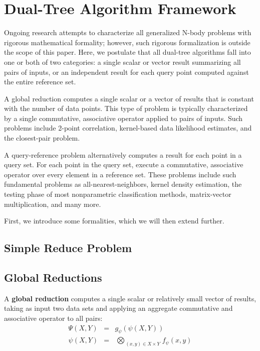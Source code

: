 \documentclass[times, leqno,twocolumn]{article}
\newcommand{\defterm}[1]{{\bf #1}}
\newcommand{\myOp}[1]{\mathop{\bigotimes\nolimits\!\!_{#1}}}
\newcommand{\letterglob}{\psi}
\newcommand{\outglob}{\Psi}
\newcommand{\inglob}{\psi}
\newcommand{\Opglob}{\myOp{\letterglob}}
\newcommand{\fglob}{f_{\letterglob}}
\newcommand{\gglob}{g_{\letterglob}}
\begin{document}
\section{Dual-Tree Algorithm Framework}

Ongoing research attempts to characterize all generalized N-body problems with rigorous mathematical formality; however, such rigorous formalization is outside the scope of this paper.
Here, we postulate that all dual-tree algorithms fall into one or both of two categories: a single scalar or vector result summarizing all pairs of inputs, or an independent result for each query point computed against the entire reference set.

A global reduction computes a single scalar or a vector of results that is constant with the number of data points.
This type of problem is typically characterized by a single commutative, associative operator applied to pairs of inputs.
Such problems include 2-point correlation, kernel-based data likelihood estimates, and the closest-pair problem.

A query-reference problem alternatively computes a result for each point in a query set.
For each point in the query set, execute a commutative, associative operator over every element in a reference set.
These problems include such fundamental problems as all-nearest-neighbors, kernel density estimation, the testing phase of most nonparametric classification methods, matrix-vector multiplication, and many more.

First, we introduce some formalities, which we will then extend further.

\subsection{Simple Reduce Problem}

\subsection{Global Reductions}

A \defterm{global reduction} computes a single scalar or relatively small vector of results, taking as input two data sets and applying an aggregate commutative and associative operator to all pairs:
\begin{eqnarray*}
\outglob(X, Y) &=& \gglob(\inglob(X, Y))
\\
\inglob(X, Y) &=& \Opglob_{(x, y) \in X \times Y} \fglob(x, y)
\label{eqn:defglob}
\end{eqnarray*}
\end{document}

